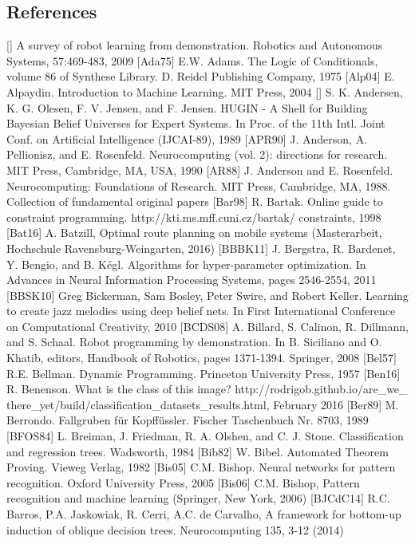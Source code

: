 \documentclass[10pt]{book}
\begin{document}
\subsection{References}
[\cite{acm2009survey}] A survey of robot learning from demonstration. Robotics and Autonomous Systems, 57:469-483, 2009
[Ada75] E.W. Adams. The Logic of Conditionals, volume 86 of Synthese Library. D. Reidel Publishing Company, 1975
[Alp04] E. Alpaydin. Introduction to Machine Learning. MIT Press, 2004
[\cite{andersen1989hugin}] S. K. Andersen, K. G. Olesen, F. V. Jensen, and F. Jensen. HUGIN - A Shell for Building Bayesian Belief Universes for Expert Systems. In Proc. of the 11th Intl. Joint Conf. on Artificial Intelligence (IJCAI-89), 1989
[APR90] J. Anderson, A. Pellionisz, and E. Rosenfeld. Neurocomputing (vol. 2): directions for research. MIT Press, Cambridge, MA, USA, 1990
[AR88] J. Anderson and E. Rosenfeld. Neurocomputing: Foundations of Research. MIT Press, Cambridge, MA, 1988. Collection of fundamental original papers
[Bar98] R. Bartak. Online guide to constraint programming. http://kti.ms.mff.cuni.cz/bartak/ constraints, 1998
[Bat16] A. Batzill, Optimal route planning on mobile systems (Masterarbeit, Hochschule Ravensburg-Weingarten, 2016)
[BBBK11] J. Bergstra, R. Bardenet, Y. Bengio, and B. Kégl. Algorithms for hyper-parameter optimization. In Advances in Neural Information Processing Systems, pages 2546-2554, 2011
[BBSK10] Greg Bickerman, Sam Bosley, Peter Swire, and Robert Keller. Learning to create jazz melodies using deep belief nets. In First International Conference on Computational Creativity, 2010
[BCDS08] A. Billard, S. Calinon, R. Dillmann, and S. Schaal. Robot programming by demonstration. In B. Siciliano and O. Khatib, editors, Handbook of Robotics, pages 1371-1394. Springer, 2008
[Bel57] R.E. Bellman. Dynamic Programming. Princeton University Press, 1957
[Ben16] R. Benenson. What is the class of this image? http://rodrigob.github.io/are_we_ there_yet/build/classification_datasets_results.html, February 2016
[Ber89] M. Berrondo. Fallgruben für Kopffüssler. Fischer Taschenbuch Nr. 8703, 1989
[BFOS84] L. Breiman, J. Friedman, R. A. Olshen, and C. J. Stone. Classification and regression trees. Wadsworth, 1984
[Bib82] W. Bibel. Automated Theorem Proving. Vieweg Verlag, 1982
[Bis05] C.M. Bishop. Neural networks for pattern recognition. Oxford University Press, 2005
[Bis06] C.M. Bishop, Pattern recognition and machine learning (Springer, New York, 2006)
[BJCdC14] R.C. Barros, P.A. Jaskowiak, R. Cerri, A.C. de Carvalho, A framework for bottom-up induction of oblique decision trees. Neurocomputing 135, 3-12 (2014)
\end{document}
